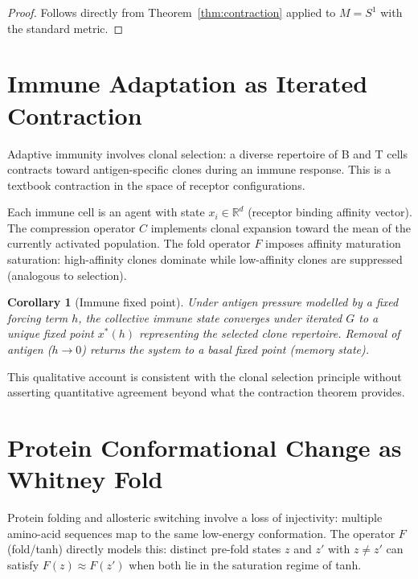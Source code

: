\documentclass[12pt,a4paper]{article}
\newtheorem{corollary}[theorem]{Corollary}
\begin{document}
\begin{proof}
Follows directly from Theorem~\ref{thm:contraction} applied to $M = S^1$ with
the standard metric.
\end{proof}

\section{Immune Adaptation as Iterated Contraction}
\label{sec:immune}

Adaptive immunity involves clonal selection: a diverse repertoire of B and T
cells contracts toward antigen-specific clones during an immune response.  This
is a textbook contraction in the space of receptor configurations.

Each immune cell is an agent with state $x_i \in \mathbb{R}^d$ (receptor
binding affinity vector).  The compression operator $C$ implements clonal
expansion toward the mean of the currently activated population.  The fold
operator $F$ imposes affinity maturation saturation: high-affinity clones
dominate while low-affinity clones are suppressed (analogous to selection).

\begin{corollary}[Immune fixed point]
\label{cor:immune}
Under antigen pressure modelled by a fixed forcing term $h$, the collective
immune state converges under iterated $G$ to a unique fixed point $x^*(h)$
representing the selected clone repertoire.  Removal of antigen ($h \to 0$)
returns the system to a basal fixed point (memory state).
\end{corollary}

This qualitative account is consistent with the clonal selection principle
\cite{burnet1959} without asserting quantitative agreement beyond what the
contraction theorem provides.

\section{Protein Conformational Change as Whitney Fold}
\label{sec:protein}

Protein folding and allosteric switching involve a loss of injectivity: multiple
amino-acid sequences map to the same low-energy conformation.  The operator $F$
(fold/tanh) directly models this: distinct pre-fold states $z$ and $z'$ with
$z \neq z'$ can satisfy $F(z) \approx F(z')$ when both lie in the saturation
regime of tanh.
\end{document}
